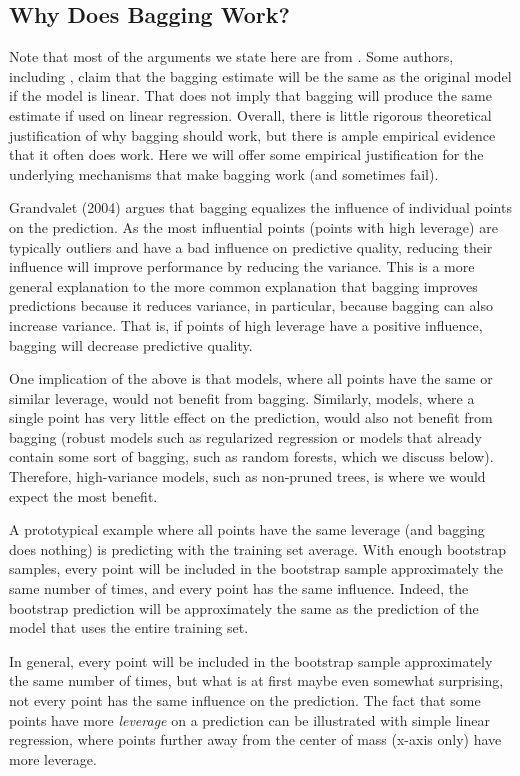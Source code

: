 \begin{refsection}
\subsection*{Why Does Bagging Work?}

Note that most of the arguments we state here are from \citet{Grandvalet2004}. Some authors, including \citet{ESL}, claim that the bagging estimate will be the same as the original model if the model is linear. That does not imply that bagging will produce the same estimate if used on linear regression. Overall, there is little rigorous theoretical justification of why bagging should work, but there is ample empirical evidence that it often does work. Here we will offer some empirical justification for the underlying mechanisms that make bagging work (and sometimes fail).

Grandvalet (2004) argues that bagging equalizes the influence of individual points on the prediction. As the most influential points (points with high leverage) are typically outliers and have a bad influence on predictive quality, reducing their influence will improve performance by reducing the variance. This is a more general explanation to the more common explanation that bagging improves predictions because it reduces variance, in particular, because bagging can also increase variance. That is, if points of high leverage have a positive influence, bagging will decrease predictive quality.

One implication of the above is that models, where all points have the same or similar leverage, would not benefit from bagging. Similarly, models, where a single point has very little effect on the prediction, would also not benefit from bagging (robust models such as regularized regression or models that already contain some sort of bagging, such as random forests, which we discuss below). Therefore, high-variance models, such as non-pruned trees, is where we would expect the most benefit.

A prototypical example where all points have the same leverage (and bagging does nothing) is predicting with the training set average. With enough bootstrap samples, every point will be included in the bootstrap sample approximately the same number of times, and every point has the same influence. Indeed, the bootstrap prediction will be approximately the same as the prediction of the model that uses the entire training set.

In general, every point will be included in the bootstrap sample approximately the same number of times, but what is at first maybe even somewhat surprising, not every point has the same influence on the prediction. The fact that some points have more {\em leverage} on a prediction can be illustrated with simple linear regression, where points further away from the center of mass (x-axis only) have more leverage.


\end{refsection}
